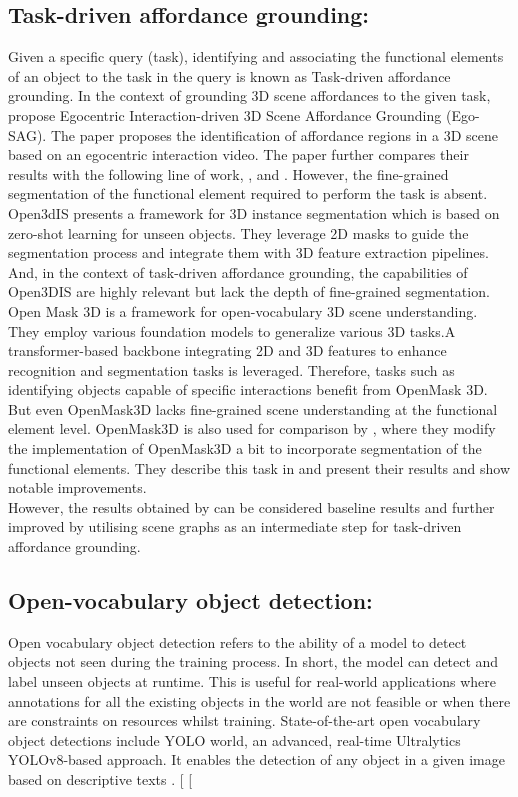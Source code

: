  \subsection{Task-driven affordance grounding:}
Given a specific query (task), identifying and associating the functional elements of an object to the task in the query is known as Task-driven affordance grounding. 
In the context of grounding 3D scene affordances to the given task, \citet{liu2024grounding3dsceneaffordance} propose
 Egocentric Interaction-driven 3D Scene Affordance Grounding (Ego-SAG). The paper proposes the identification of affordance regions in a 3D scene based on 
 an egocentric interaction video. The paper further compares their results with the following line of work,
\cite{huang2024openins3dsnaplookup3d}, \cite{Nguyen_2024_CVPR} and \cite{takmaz2023openmask3dopenvocabulary3dinstance}. However, the fine-grained 
segmentation of the functional element required to perform the task is absent. Open3dIS presents a framework for 3D instance segmentation which is based on
zero-shot learning for unseen objects. They leverage 2D masks to guide the segmentation process and integrate them with 3D feature extraction pipelines. And, in the context
of task-driven affordance grounding, the capabilities of Open3DIS are highly relevant but lack the depth of fine-grained segmentation. Open Mask 3D is a framework
 for open-vocabulary 3D scene understanding. They employ
various foundation models to generalize various 3D tasks.A transformer-based backbone integrating 2D and 3D features to enhance recognition and segmentation tasks is leveraged. 
Therefore, tasks such as identifying objects capable of specific interactions benefit from OpenMask 3D. 
But even OpenMask3D lacks fine-grained scene understanding at the functional element level.
OpenMask3D \cite{takmaz2023openmask3dopenvocabulary3dinstance} is also used for comparison by
\citet{delitzas2024scenefun3d}, where they modify the implementation of OpenMask3D a bit to incorporate segmentation of the functional elements. 
They describe this task in \cite{delitzas2024scenefun3d} and present their results and show notable improvements.\\
However, the results obtained by \citet{delitzas2024scenefun3d}
can be considered baseline results and further improved by utilising scene graphs as an intermediate step for task-driven affordance grounding.
 \subsection{Open-vocabulary object detection:}
Open vocabulary object detection refers to the ability of a model to detect objects not seen during the training process. 
In short, the model can detect and label unseen objects at runtime. This is useful for real-world applications where annotations for all the 
existing objects in the world are not feasible or when there are constraints on resources whilst training. State-of-the-art open vocabulary object detections include
YOLO world, an advanced, real-time Ultralytics YOLOv8-based approach. It enables the detection of any object in a given image based on descriptive texts \cite{cheng2024yolow}. 
[
    [

